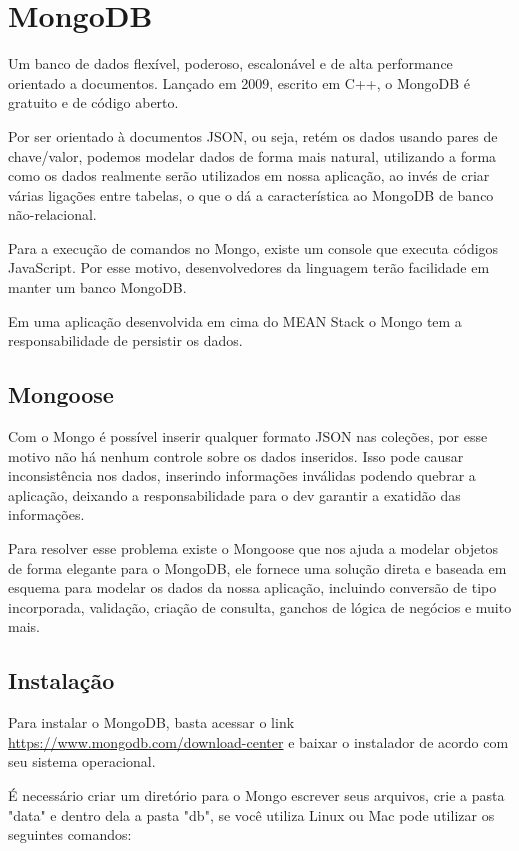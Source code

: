 \documentclass[
	12pt,				%
	openright,			%
	twoside,			%
	a4paper,			%
	english,			%
	brazil				%
	]{abntex2}
\begin{document}
\section{MongoDB}

Um banco de dados flexível, poderoso, escalonável e de alta performance orientado a documentos. Lançado em 2009, escrito em C++, o MongoDB é gratuito e de código aberto.

Por ser orientado à documentos JSON, ou seja, retém os dados usando pares de chave/valor, podemos modelar dados de forma mais natural, utilizando a forma como os dados realmente serão utilizados em nossa aplicação, ao invés de criar várias ligações entre tabelas, o que o dá a característica ao MongoDB de banco não-relacional.

Para a execução de comandos no Mongo, existe um console que executa códigos JavaScript. Por esse motivo, desenvolvedores da linguagem terão facilidade em manter um banco MongoDB.

Em uma aplicação desenvolvida em cima do MEAN Stack o Mongo tem a responsabilidade de persistir os dados.

\subsection{Mongoose}

Com o Mongo é possível inserir qualquer formato JSON nas coleções, por esse motivo não há nenhum controle sobre os dados inseridos. Isso pode causar inconsistência nos dados, inserindo informações inválidas podendo quebrar a aplicação, deixando a responsabilidade para o dev garantir a exatidão das informações.

Para resolver esse problema existe o Mongoose que nos ajuda a modelar objetos de forma elegante para o MongoDB, ele fornece uma solução direta e baseada em esquema para modelar os dados da nossa aplicação, incluindo conversão de tipo incorporada, validação, criação de consulta, ganchos de lógica de negócios e muito mais.

\subsection{Instalação}

Para instalar o MongoDB, basta acessar o link \url{https://www.mongodb.com/download-center} e baixar o instalador de acordo com seu sistema operacional.

É necessário criar um diretório para o Mongo escrever seus arquivos, crie a pasta "data" e dentro dela a pasta "db", se você utiliza Linux ou Mac pode utilizar os seguintes comandos:
\end{document}

